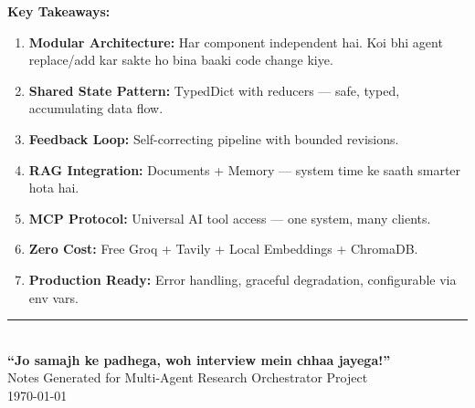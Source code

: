 \documentclass[12pt, a4paper]{article}
\begin{document}
\begin{center}
\end{center}

\begin{notebox}
\textbf{Key Takeaways:}
\begin{enumerate}
\item \textbf{Modular Architecture:} Har component independent hai. Koi bhi agent replace/add kar sakte ho bina baaki code change kiye.
\item \textbf{Shared State Pattern:} TypedDict with reducers --- safe, typed, accumulating data flow.
\item \textbf{Feedback Loop:} Self-correcting pipeline with bounded revisions.
\item \textbf{RAG Integration:} Documents + Memory --- system time ke saath smarter hota hai.
\item \textbf{MCP Protocol:} Universal AI tool access --- one system, many clients.
\item \textbf{Zero Cost:} Free Groq + Tavily + Local Embeddings + ChromaDB.
\item \textbf{Production Ready:} Error handling, graceful degradation, configurable via env vars.
\end{enumerate}
\end{notebox}

\vfill
\begin{center}
\color{accentpurple}\rule{0.8\textwidth}{2pt}\\[10pt]
{\Large\bfseries\color{accentpurple} ``Jo samajh ke padhega, woh interview mein chhaa jayega!''}\\[5pt]
{\color{comment}\small Notes Generated for Multi-Agent Research Orchestrator Project}\\
{\color{comment}\small \today}
\end{center}
\end{document}
